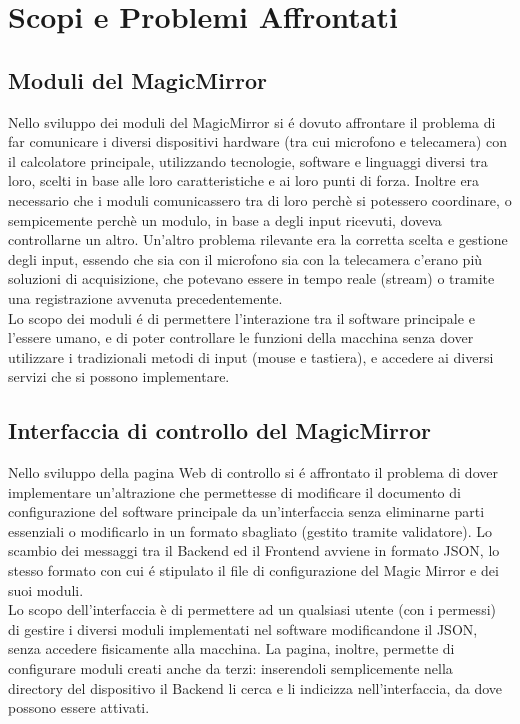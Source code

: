 \chapter{Scopi e Problemi Affrontati}

\section{Moduli del MagicMirror}
Nello sviluppo dei moduli del MagicMirror si \'e dovuto affrontare il problema di far comunicare
i diversi dispositivi hardware (tra cui microfono e telecamera) con il calcolatore principale, utilizzando tecnologie,
software e linguaggi diversi tra loro, scelti in base alle loro caratteristiche e ai loro punti di forza.
Inoltre era necessario che i moduli comunicassero tra di loro perchè si potessero coordinare, o sempicemente
perchè un modulo, in base a degli input ricevuti, doveva controllarne un altro.
Un'altro problema rilevante era la corretta scelta e gestione degli input, essendo che sia con il microfono sia
con la telecamera c'erano più soluzioni di acquisizione, che potevano essere in tempo reale (stream)
o tramite una registrazione avvenuta precedentemente.\\
Lo scopo dei moduli \'e di permettere l'interazione tra il software principale
e l'essere umano, e di poter controllare le funzioni della macchina senza dover utilizzare
i tradizionali metodi di input (mouse e tastiera), e accedere ai diversi servizi che si possono implementare.
\\[2\baselineskip]
\section{Interfaccia di controllo del MagicMirror}
Nello sviluppo della pagina Web di controllo si \'e affrontato il problema di dover
implementare un'altrazione che permettesse di modificare
il documento di configurazione del software principale da un'interfaccia senza eliminarne parti essenziali
o modificarlo in un formato sbagliato (gestito tramite validatore).
Lo scambio dei messaggi tra il Backend ed il Frontend avviene in formato JSON, lo stesso formato
con cui \'e stipulato il file di configurazione del Magic Mirror e dei suoi moduli.\\
Lo scopo dell'interfaccia è di permettere ad un qualsiasi utente (con i permessi) di gestire
i diversi moduli implementati nel software modificandone il JSON, senza accedere fisicamente alla macchina.
La pagina, inoltre, permette di configurare moduli creati anche da terzi: inserendoli
semplicemente nella directory del dispositivo il Backend li cerca e li indicizza nell'interfaccia,
da dove possono essere attivati.
